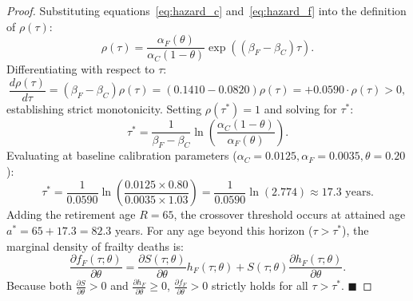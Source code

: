 \documentclass[11pt,a4paper]{article}
\begin{document}
\begin{proof}
Substituting equations~\eqref{eq:hazard_c} and~\eqref{eq:hazard_f} into the definition of $\rho(\tau)$:
\begin{equation}
    \rho(\tau) = \frac{\alpha_F(\theta)}{\alpha_C(1 - \theta)} \exp\left( (\beta_F - \beta_C)\tau \right).
\end{equation}
Differentiating with respect to $\tau$:
\begin{equation}
    \frac{d\rho(\tau)}{d\tau} = (\beta_F - \beta_C) \rho(\tau) = (0.1410 - 0.0820) \rho(\tau) = +0.0590 \cdot \rho(\tau) > 0,
\end{equation}
establishing strict monotonicity. Setting $\rho(\tau^*) = 1$ and solving for $\tau^*$:
\begin{equation}
    \tau^* = \frac{1}{\beta_F - \beta_C} \ln\left( \frac{\alpha_C(1 - \theta)}{\alpha_F(\theta)} \right).
\end{equation}
Evaluating at baseline calibration parameters ($\alpha_C = 0.0125, \alpha_F = 0.0035, \theta = 0.20$):
\begin{equation}
    \tau^* = \frac{1}{0.0590} \ln\left( \frac{0.0125 \times 0.80}{0.0035 \times 1.03} \right) = \frac{1}{0.0590} \ln(2.774) \approx 17.3 \text{ years}.
\end{equation}
Adding the retirement age $R = 65$, the crossover threshold occurs at attained age $a^* = 65 + 17.3 = 82.3$ years. For any age beyond this horizon ($\tau > \tau^*$), the marginal density of frailty deaths is:
\begin{equation}
    \frac{\partial f_F(\tau; \theta)}{\partial \theta} = \frac{\partial S(\tau; \theta)}{\partial \theta} h_F(\tau; \theta) + S(\tau; \theta) \frac{\partial h_F(\tau; \theta)}{\partial \theta}.
\end{equation}
Because both $\frac{\partial S}{\partial \theta} > 0$ and $\frac{\partial h_F}{\partial \theta} \ge 0$, $\frac{\partial f_F}{\partial \theta} > 0$ strictly holds for all $\tau > \tau^*$. \hfill $\blacksquare$
\end{proof}
\end{document}
